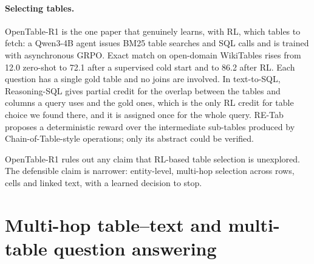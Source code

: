 \paragraph{Selecting tables.} OpenTable-R1 \citep{qiu2025opentabler1} is the one paper that genuinely learns, with RL, which tables to fetch: a Qwen3-4B agent issues BM25 table searches and SQL calls and is trained with asynchronous GRPO. Exact match on open-domain WikiTables rises from 12.0 zero-shot to 72.1 after a supervised cold start and to 86.2 after RL. Each question has a single gold table and no joins are involved. In text-to-SQL, Reasoning-SQL \citep{pourreza2025reasoningsql} gives partial credit for the overlap between the tables and columns a query uses and the gold ones, which is the only RL credit for table choice we found there, and it is assigned once for the whole query. RE-Tab \citep{kwok2026retab} proposes a deterministic reward over the intermediate sub-tables produced by Chain-of-Table-style operations; only its abstract could be verified.

OpenTable-R1 rules out any claim that RL-based table selection is unexplored. The defensible claim is narrower: entity-level, multi-hop selection across rows, cells and linked text, with a learned decision to stop.

\section{Multi-hop table--text and multi-table question answering}
\label{sec:lit-hybrid}

